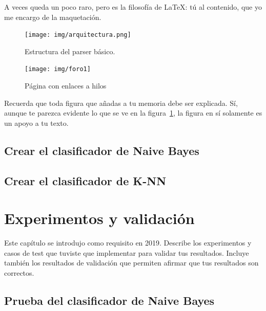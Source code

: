 \documentclass[a4paper, 12pt]{book}
\begin{document}
A veces queda un poco raro, pero es la filosofía de \LaTeX: tú al contenido, que yo me encargo de la maquetación.

\begin{figure}
  \centering
  \texttt{[image: img/arquitectura.png]}
  \caption{Estructura del parser básico.}\label{fig:arquitectura}
\end{figure}

\begin{figure}
    \centering
    \texttt{[image: img/foro1]}
    \caption{Página con enlaces a hilos}\label{fig:_arquitectura}
\end{figure}

 
Recuerda que toda figura que añadas a tu memoria debe ser explicada.
Sí, aunque te parezca evidente lo que se ve en la figura~\ref{fig:arquitectura}, la figura en sí solamente es un apoyo a tu texto.


\section{Crear el clasificador de Naive Bayes} 
\label{sec:naivebayes}



\section{Crear el clasificador de K-NN} 
\label{sec:knn}




\cleardoublepage
\chapter{Experimentos y validación}

Este capítulo se introdujo como requisito en 2019. 
Describe los experimentos y casos de test que tuviste que implementar para validar tus resultados. 
Incluye también los resultados de validación que permiten afirmar que tus resultados son correctos. 

\section{Prueba del clasificador de Naive Bayes} 
\label{sec:pruebabayes}
\end{document}
